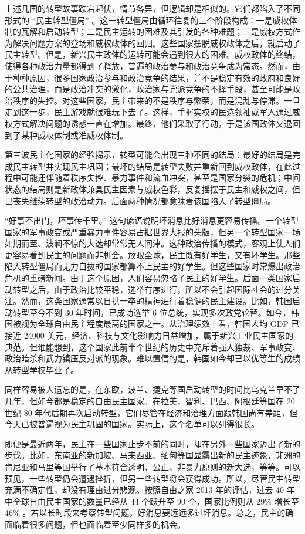 上述几国的转型故事跌宕起伏，情节各异，但逻辑却是相似的。它们都陷入了不同形式的 “民主转型僵局” 。这一转型僵局由循环往复的三个阶段构成：一是威权体制的瓦解和启动转型；二是民主运转的困难及其引发的各种难题；三是威权方式作为解决问题方案的登场和威权政体的回归。这些国家摆脱威权政体之后，就启动了民主转型。但是，新兴民主政体的运转可能会遇到很大的困难。威权政体的终结，使得各种政治力量都得到了释放，普遍的政治参与和政治竞争成为常态。然而，由于种种原因，很多国家政治参与和政治竞争的结果，并不是稳定有效的政府和良好的公共治理，而是政治冲突的激化，政治家与党派竞争的不择手段，甚至可能是政治秩序的失控。对这些国家，民主带来的不是秩序与繁荣，而是混乱与停滞。一旦走到这一步，民主游戏就很难玩下去了。这样，手握实权的民选领袖或军人通过威权方式解决问题的诱惑一直在增加。最终，他们采取了行动，于是该国政体又退回到了某种威权体制或准威权体制。

第三波民主化国家的经验揭示，转型可能会出现三种不同的结局：最好的结局是完成民主转型并实现民主巩固；最坏的结局是转型失败并重新回到威权政体，在此过程中可能还伴随着秩序失控、暴力事件和流血冲突，甚至是国家分裂的危机；中间状态的结局则是新政体兼具民主因素与威权色彩，反复摇摆于民主和威权之间，但已丧失继续转型的政治动力。后面两种情况都意味着该国陷入了转型僵局。

 “好事不出门，坏事传千里。” 这句谚语说明坏消息比好消息更容易传播。一个转型国家的军事政变或严重暴力事件容易占据世界大报的头版，但另一个转型国家一场如期而至、波澜不惊的大选却常常无人问津。这种政治传播的模式，客观上使人们更容易看到民主的问题而非机会。放眼全球，民主既有好学生，又有坏学生。那些陷入转型僵局而无力自拔的国家都算不上民主的好学生。但这些国家时常爆出政治危机的重磅新闻。由于这个原因，人们容易忽略了民主的好学生。后面一类国家启动转型之后，由于政治比较平稳，选举有序进行，所以不会引起国际社会的过分关注。然而，这类国家通常以日拱一卒的精神进行着稳健的民主建设。比如，韩国启动转型至今不到 30 年时间，已成功选举 6 位总统，实现多次政党轮替。如今，韩国被视为全球自由民主程度最高的国家之一。从治理绩效上看，韩国人均 GDP 已接近 24000 美元，经济、科技与文化影响力日益增加，属于新兴工业民主国家的典范。但谁能想到，这个国家此前半个世纪的历史中充斥着强人独裁、军事政变、政治暗杀和武力镇压反对派的现象。难以置信的是，韩国如今却已以优等生的成绩从转型学校毕业了。

同样容易被人遗忘的是，在东欧，波兰、捷克等国启动转型的时间比乌克兰早不了几年，但如今都是稳定的自由民主国家。在拉美，智利、巴西、阿根廷等国在 20 世纪 80 年代后期再次启动转型，它们尽管在经济和治理方面跟韩国尚有差距，但今天已被普遍视为民主巩固的国家。实际上，这个名单可以列得很长。

即便是最近两年，民主在一些国家止步不前的同时，却在另外一些国家迈出了新的步伐。比如，东南亚的新加坡、马来西亚、缅甸等国显露出新的民主迹象，非洲的肯尼亚和马里等国举行了基本符合透明、公正、非暴力原则的新大选，等等。可以预见，一些转型仍会遭遇挫折，但另一些转型将会获得成功。所以，尽管民主转型充满不确定性，却没有理由过分悲观。按照自由之家 2013 年的评估，过去 40 年中全球自由民主国家的数量已经从 44 个跃升至 90 个，国家比例则从 29\% 增长至 46\% 。若以长时段来考察转型问题，好消息要远远多过坏消息。总之，民主的确面临着很多问题，但也面临着至少同样多的机会。

